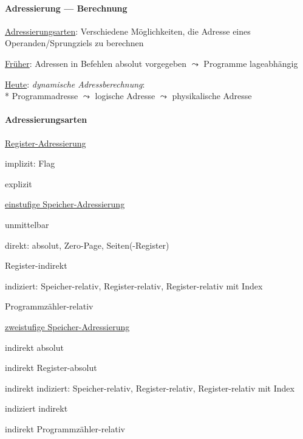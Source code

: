 \paragraph{Adressierung --- Berechnung}
\begin{items}
	\item \underline{Adressierungsarten}: Verschiedene Möglichkeiten, die Adresse eines Operanden/Sprungziels zu berechnen
	\item \underline{Früher}: Adressen in Befehlen absolut vorgegeben $\leadsto$ Programme lageabhängig
	\item \underline{Heute}: \emph{dynamische Adressberechnung}: \\*
		Programmadresse $\leadsto$ logische Adresse $\leadsto$ physikalische Adresse
\end{items}

\paragraph{Adressierungsarten}
\begin{enumeration}
	\item \underline{Register-Adressierung}
	\begin{enumeration}
		\item implizit: Flag
		\item explizit
	\end{enumeration}
	\item \underline{einstufige Speicher-Adressierung}
	\begin{enumeration}
		\item unmittelbar
		\item direkt: absolut, Zero-Page, Seiten(-Register)
		\item Register-indirekt
		\item indiziert: Speicher-relativ, Register-relativ, Register-relativ mit Index
		\item Programmzähler-relativ
	\end{enumeration}
	\item \underline{zweistufige Speicher-Adressierung}
	\begin{enumeration}
		\item indirekt absolut
		\item indirekt Register-absolut
		\item indirekt indiziert: Speicher-relativ, Register-relativ, Register-relativ mit Index
		\item indiziert indirekt
		\item indirekt Programmzähler-relativ
	\end{enumeration}
\end{enumeration}

